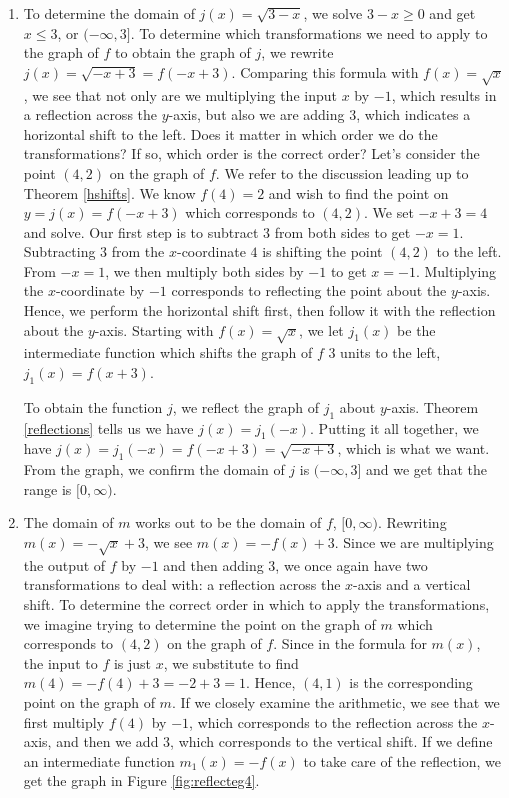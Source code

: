 {\begin{enumerate}
\item  To determine the domain of  $j(x) = \sqrt{3-x}$, we solve $3-x \geq 0$ and get $x \leq 3$, or $(-\infty, 3]$.  To determine which transformations we need to apply to the graph of $f$ to obtain the graph of $j$, we rewrite $j(x) = \sqrt{-x+3} = f(-x+3)$. Comparing this formula with $f(x) = \sqrt{x}$, we see that not only are we multiplying the input $x$ by $-1$, which results in a reflection across the $y$-axis, but also we are adding $3$, which indicates a horizontal shift to the left.  Does it matter in which order we do the transformations?  If so, which order is the correct order?  Let's consider the point $(4,2)$ on the graph of $f$.  We refer to the discussion leading up to Theorem \ref{hshifts}.  We know $f(4) = 2$ and wish to find the point on $y=j(x) = f(-x+3)$ which corresponds to $(4,2)$.  We set $-x+3 = 4$ and solve.  Our first step is to subtract $3$ from both sides to get $-x=1$.  Subtracting $3$ from the $x$-coordinate $4$ is shifting the point $(4,2)$ to the left.   From $-x=1$, we then multiply both sides by $-1$ to get $x=-1$.  Multiplying the $x$-coordinate by $-1$ corresponds to reflecting the point about the $y$-axis.  Hence, we perform the horizontal shift first, then follow it with the reflection about the $y$-axis.  Starting with $f(x) = \sqrt{x}$, we let $j_{1}(x)$ be the intermediate function which shifts the graph of $f$ $3$ units to the left, $j_{1}(x) = f(x+3)$. 

To obtain the function $j$, we reflect the graph of $j_{1}$ about $y$-axis.   Theorem \ref{reflections} tells us we have $j(x) = j_{1}(-x)$. Putting it all together, we have $j(x) = j_{1}(-x) = f(-x+3) = \sqrt{-x+3}$, which is what we want. From the graph, we confirm the domain of $j$ is $(-\infty, 3]$ and we get that the range is $[0, \infty)$.



\item  The domain of $m$ works out to be the domain of $f$, $[0, \infty)$.  Rewriting $m(x) = -\sqrt{x} + 3$, we see $m(x) = -f(x) + 3$.  Since we are multiplying the output of $f$ by $-1$ and then adding $3$, we once again have two transformations to deal with:  a reflection across the $x$-axis and a vertical shift.  To determine the correct order in which to apply the transformations, we imagine trying to determine the point on the graph of $m$ which corresponds to $(4,2)$ on the graph of $f$.  Since in the formula for $m(x)$, the input to $f$ is just $x$, we substitute to find  $m(4) = -f(4)+3 = -2+3=1$.  Hence, $(4,1)$ is the corresponding point on the graph of $m$. If we closely examine the arithmetic, we see that we first multiply $f(4)$ by $-1$, which corresponds to the reflection across the $x$-axis, and then we add $3$, which corresponds to the vertical shift.  If we define an intermediate function $m_{1}(x) = -f(x)$ to take care of the reflection, we get the graph in Figure \ref{fig:reflecteg4}.


\end{enumerate}}
